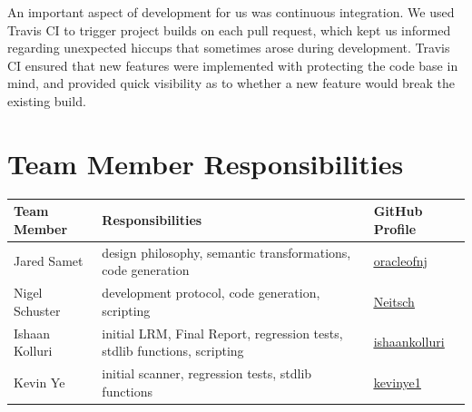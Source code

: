   \medskip \noindent
  An important aspect of development for us was continuous integration. We used Travis CI to trigger project builds on each pull request, which kept us informed regarding unexpected hiccups that sometimes arose during development. Travis CI ensured that new features were implemented with protecting the code base in mind, and provided quick visibility as to whether a new feature would break the existing build.

\section{Team Member Responsibilities}

\begin{tabular}{ | l | l | l |}\hline
  Team Member  & Responsibilities      & GitHub Profile\\ \hline
  Jared Samet & design philosophy, semantic transformations, code generation  & \underline{\href{https://github.com/oracleofnj}{oracleofnj}}\\
  Nigel Schuster & development protocol, code generation, scripting  & \underline{\href{https://github.com/Neitsch}{Neitsch}}\\
  Ishaan Kolluri & initial LRM, Final Report, regression tests, stdlib functions, scripting & \underline{\href{https://github.com/ishaankolluri}{ishaankolluri}}\\
  Kevin Ye & initial scanner, regression tests, stdlib functions & \underline{\href{https://github.com/kevinye1}{kevinye1}}\\ \hline
\end{tabular}
